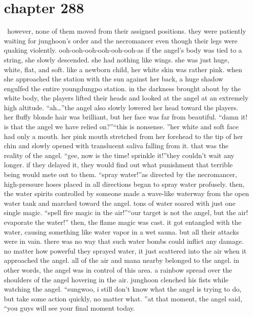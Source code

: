 \section{chapter 288}






 however, none of them moved from their assigned positions.
 they were patiently waiting for junghoon’s order and the necromancer even though their legs were quaking violently.
ooh-ooh-ooh-ooh-ooh-ooh-as if the angel’s body was tied to a string, she slowly descended.
 she had nothing like wings.
 she was just huge, white, flat, and soft.
 like a newborn child, her white skin was rather pink.
when she approached the station with the sun against her back, a huge shadow engulfed the entire youngdungpo station.
 in the darkness brought about by the white body, the players lifted their heads and looked at the angel at an extremely high altitude.
“ah…”the angel also slowly lowered her head toward the players.
 her fluffy blonde hair was brilliant, but her face was far from beautiful.
“damn it! is that the angel we have relied on?”“this is nonsense.
”her white and soft face had only a mouth.
 her pink mouth stretched from her forehead to the tip of her chin and slowly opened with translucent saliva falling from it.
that was the reality of the angel.
“gee, now is the time! sprinkle it!”they couldn’t wait any longer.
 if they delayed it, they would find out what punishment that terrible being would mete out to them.
“spray water!”as directed by the necromancer, high-pressure hoses placed in all directions began to spray water profusely.
then, the water spirits controlled by someone made a wave-like waterway from the open water tank and marched toward the angel.
 tons of water soared with just one single magic.
“spell fire magic in the air!”“our target is not the angel, but the air! evaporate the water!”
then, the flame magic was cast.
 it got entangled with the water, causing something like water vapor in a wet sauna.
but all their attacks were in vain.
 there was no way that such water bombs could inflict any damage.
 no matter how powerful they sprayed water, it just scattered into the air when it approached the angel.
 all of the air and mana nearby belonged to the angel.
in other words, the angel was in control of this area.
a rainbow spread over the shoulders of the angel hovering in the air.
junghoon clenched his fists while watching the angel.
“sungwoo, i still don’t know what the angel is trying to do, but take some action quickly, no matter what.
”at that moment, the angel said, “you guys will see your final moment today.

